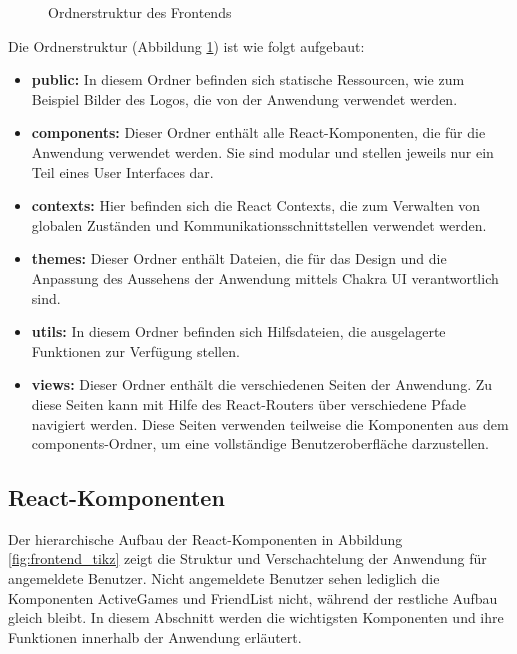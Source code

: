 \begin{figure}[h!]
\centering

\begin{minipage}{0.5\textwidth}
\end{minipage}
\caption{Ordnerstruktur des Frontends}
\label{fig:frontend_dirtree}

\end{figure}

Die Ordnerstruktur (Abbildung \ref{fig:frontend_dirtree}) ist wie folgt aufgebaut:
\begin{itemize}
\item \textbf{public:} In diesem Ordner befinden sich statische Ressourcen, wie zum Beispiel Bilder des Logos, die von der Anwendung verwendet werden.
\item \textbf{components:} Dieser Ordner enthält alle React-Komponenten, die für die Anwendung verwendet werden. Sie sind modular und stellen jeweils nur ein Teil eines User Interfaces dar.
\item \textbf{contexts:} Hier befinden sich die React Contexts, die zum Verwalten von globalen Zuständen und Kommunikationsschnittstellen verwendet werden.
\item \textbf{themes:} Dieser Ordner enthält Dateien, die für das Design und die Anpassung des Aussehens der Anwendung mittels Chakra UI verantwortlich sind.
\item \textbf{utils:} In diesem Ordner befinden sich Hilfsdateien, die ausgelagerte Funktionen zur Verfügung stellen.
\item \textbf{views:} Dieser Ordner enthält die verschiedenen Seiten der Anwendung. Zu diese Seiten kann mit Hilfe des React-Routers über verschiedene Pfade navigiert werden. Diese Seiten verwenden teilweise die Komponenten aus dem components-Ordner, um eine vollständige Benutzeroberfläche darzustellen.
\end{itemize}
    
        \subsection{React-Komponenten}
Der hierarchische Aufbau der React-Komponenten in Abbildung \ref{fig:frontend_tikz} zeigt die Struktur und Verschachtelung der Anwendung für angemeldete Benutzer. Nicht angemeldete Benutzer sehen lediglich die Komponenten ActiveGames und FriendList nicht, während der restliche Aufbau gleich bleibt. In diesem Abschnitt werden die wichtigsten Komponenten und ihre Funktionen innerhalb der Anwendung erläutert.
        
